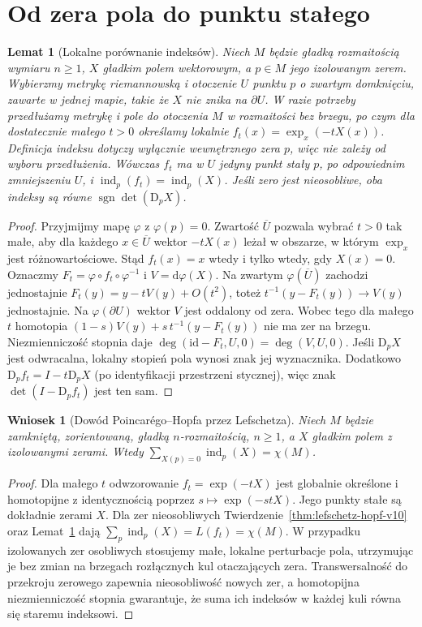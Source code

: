 \documentclass[11pt,a4paper,oneside]{report}
\newcommand{\id}{\mathrm{id}}
\newcommand{\D}{\mathrm D}
\theoremstyle{plain}
\newtheorem{lemat}[twierdzenie]{Lemat}
\newtheorem{wniosek}[twierdzenie]{Wniosek}
\theoremstyle{definition}
\theoremstyle{remark}
\begin{document}
\section{Od zera pola do punktu stałego}
\begin{lemat}[Lokalne porównanie indeksów]
\label{lem:field-fixed-v11}
Niech $M$ będzie gładką rozmaitością wymiaru $n\ge1$,
$X$ gładkim polem wektorowym, a $p\in M$ jego izolowanym zerem.
Wybierzmy metrykę riemannowską i otoczenie $U$ punktu $p$
o zwartym domknięciu, zawarte w jednej mapie, takie że
$X$ nie znika na $\partial U$. W razie potrzeby przedłużamy metrykę i pole do otoczenia
$M$ w rozmaitości bez brzegu, po czym dla dostatecznie
małego $t>0$ określamy lokalnie
$f_t(x)=\exp_x(-tX(x))$.
Definicja indeksu dotyczy wyłącznie wewnętrznego
zera $p$, więc nie zależy od wyboru przedłużenia.
Wówczas $f_t$ ma w $U$ jedyny punkt stały $p$, po odpowiednim
zmniejszeniu $U$, i
$\operatorname{ind}_p(f_t)=\operatorname{ind}_p(X)$.
Jeśli zero jest nieosobliwe, oba indeksy są równe
$\operatorname{sgn}\det(\D_pX)$.
\end{lemat}
\begin{proof}
Przyjmijmy mapę $\varphi$ z $\varphi(p)=0$.
Zwartość $\overline U$ pozwala wybrać $t>0$ tak małe,
aby dla każdego $x\in\overline U$ wektor $-tX(x)$ leżał
w obszarze, w którym $\exp_x$ jest różnowartościowe.
Stąd $f_t(x)=x$ wtedy i tylko wtedy, gdy $X(x)=0$.
Oznaczmy $F_t=\varphi\circ f_t\circ\varphi^{-1}$ i
$V=\mathrm d\varphi(X)$.
Na zwartym $\varphi(\overline U)$ zachodzi jednostajnie
$F_t(y)=y-tV(y)+O(t^2)$, toteż
$t^{-1}(y-F_t(y))\to V(y)$ jednostajnie.
Na $\varphi(\partial U)$ wektor $V$ jest oddalony od zera.
Wobec tego dla małego $t$ homotopia
$(1-s)V(y)+s\,t^{-1}(y-F_t(y))$ nie ma zer na brzegu.
Niezmienniczość stopnia daje
$\deg(\id-F_t,U,0)=\deg(V,U,0)$.
Jeśli $\D_pX$ jest odwracalna, lokalny stopień pola
wynosi znak jej wyznacznika. Dodatkowo
$\D_pf_t=I-t\D_pX$ (po identyfikacji przestrzeni stycznej),
więc znak $\det(I-\D_pf_t)$ jest ten sam.
\end{proof}

\begin{wniosek}[Dowód Poincarégo--Hopfa przez Lefschetza]
Niech $M$ będzie zamkniętą, zorientowaną, gładką
$n$-rozmaitością, $n\ge1$, a $X$ gładkim polem z izolowanymi
zerami. Wtedy $\sum_{X(p)=0}\operatorname{ind}_p(X)=\chi(M)$.
\end{wniosek}
\begin{proof}
Dla małego $t$ odwzorowanie $f_t=\exp(-tX)$ jest globalnie
określone i homotopijne z identycznością poprzez
$s\mapsto\exp(-stX)$. Jego punkty stałe są dokładnie zerami $X$.
Dla zer nieosobliwych Twierdzenie~\ref{thm:lefschetz-hopf-v10}
oraz Lemat~\ref{lem:field-fixed-v11} dają
$\sum_p\operatorname{ind}_p(X)=L(f_t)=\chi(M)$.
W przypadku izolowanych zer osobliwych stosujemy małe,
lokalne perturbacje pola, utrzymując je bez zmian na brzegach
rozłącznych kul otaczających zera. Transwersalność do
przekroju zerowego zapewnia nieosobliwość nowych zer,
a homotopijna niezmienniczość stopnia gwarantuje, że suma
ich indeksów w każdej kuli równa się staremu indeksowi.
\end{proof}
\end{document}
